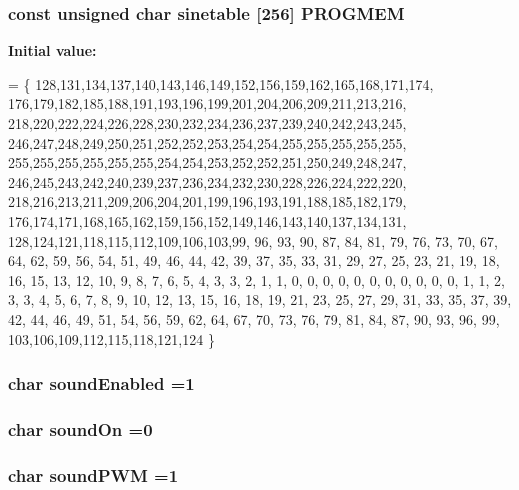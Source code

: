 \hypertarget{~main_8c_adda78152bf8af9407c0a22deb795d689}{
\subsubsection[{P\-R\-O\-G\-M\-E\-M}]{\setlength{\rightskip}{0pt plus 5cm}const unsigned char sinetable \mbox{[}256\mbox{]} P\-R\-O\-G\-M\-E\-M}}\label{~main_8c_adda78152bf8af9407c0a22deb795d689}
{\bfseries Initial value\-:}
\begin{DoxyCode}
= \{ 
128,131,134,137,140,143,146,149,152,156,159,162,165,168,171,174, 
176,179,182,185,188,191,193,196,199,201,204,206,209,211,213,216, 
218,220,222,224,226,228,230,232,234,236,237,239,240,242,243,245, 
246,247,248,249,250,251,252,252,253,254,254,255,255,255,255,255, 
255,255,255,255,255,255,254,254,253,252,252,251,250,249,248,247, 
246,245,243,242,240,239,237,236,234,232,230,228,226,224,222,220, 
218,216,213,211,209,206,204,201,199,196,193,191,188,185,182,179, 
176,174,171,168,165,162,159,156,152,149,146,143,140,137,134,131, 
128,124,121,118,115,112,109,106,103,99, 96, 93, 90, 87, 84, 81,  
79, 76, 73, 70, 67, 64, 62, 59, 56, 54, 51, 49, 46, 44, 42, 39,  
37, 35, 33, 31, 29, 27, 25, 23, 21, 19, 18, 16, 15, 13, 12, 10,  
9,  8,  7,  6,  5,  4,  3,  3,  2,  1,  1,  0,  0,  0,  0,  0,   
0,  0,  0,  0,  0,  0,  1,  1,  2,  3,  3,  4,  5,  6,  7,  8,   
9,  10, 12, 13, 15, 16, 18, 19, 21, 23, 25, 27, 29, 31, 33, 35,  
37, 39, 42, 44, 46, 49, 51, 54, 56, 59, 62, 64, 67, 70, 73, 76,  
79, 81, 84, 87, 90, 93, 96, 99, 103,106,109,112,115,118,121,124 
\}
\end{DoxyCode}
\hypertarget{~main_8c_a487767231970dc5871caf94a31630459}{
\subsubsection[{sound\-Enabled}]{\setlength{\rightskip}{0pt plus 5cm}char sound\-Enabled =1}}\label{~main_8c_a487767231970dc5871caf94a31630459}
\hypertarget{~main_8c_a522507a13e786061113a0a66d66896ab}{
\subsubsection[{sound\-On}]{\setlength{\rightskip}{0pt plus 5cm}char sound\-On =0}}\label{~main_8c_a522507a13e786061113a0a66d66896ab}
\hypertarget{~main_8c_aa1156b1e5639b3855f6d711de3799023}{
\subsubsection[{sound\-P\-W\-M}]{\setlength{\rightskip}{0pt plus 5cm}char sound\-P\-W\-M =1}}\label{~main_8c_aa1156b1e5639b3855f6d711de3799023}


